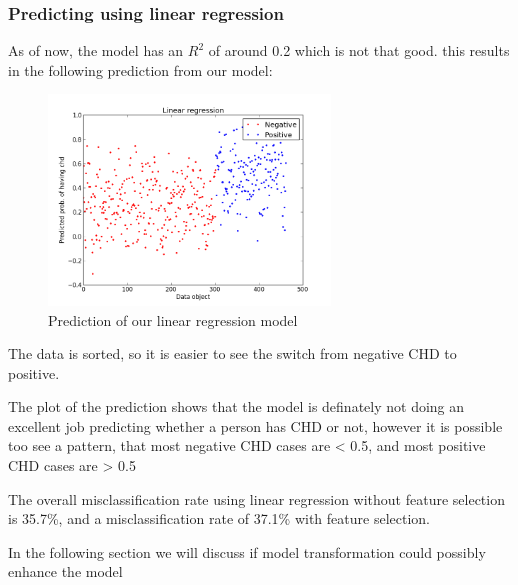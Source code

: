 \subsubsection{Predicting using linear regression}
As of now, the model has an $R^{2}$ of around 0.2 which is not that good. this results in the following prediction from our model:
\begin{figure}[H]
\centering
\includegraphics[width=7.5cm, keepaspectratio=true]{pictures/linearPrediction.png}
\caption{Prediction of our linear regression model}
\label{linearPrediction}
\end{figure}
The data is sorted, so it is easier to see the switch from negative CHD to positive.

The plot of the prediction shows that the model is definately not doing an excellent job predicting whether a person has CHD or not, however it is possible too see a pattern, that most negative CHD cases are < 0.5, and most positive CHD cases are > 0.5

The overall misclassification rate using linear regression without feature selection is 35.7\%, and a misclassification rate of 37.1\% with feature selection.

In the following section we will discuss if model transformation could possibly enhance the model
